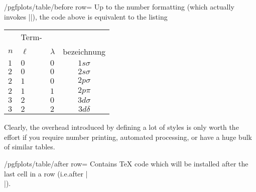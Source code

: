 \documentclass[a4paper]{ltxdoc}
\begin{document}
\begin{key}{/pgfplots/table/before row=}
    Up to the number formatting (which actually invokes |\pgfmathprintnumber|),
    the code above is equivalent to the listing
\begin{codeexample}
\begin{tabular}{|C|C|C|c|}
\hline
{}  & Term-\\
 $n$ & $\ell$ & $\lambda$ & bezeichnung\\
\hline
$1$ & $0$ & $0$ & $1 s\sigma$ \\
$2$ & $0$ & $0$ & $2 s\sigma$ \\
$2$ & $1$ & $0$ & $2 p\sigma$ \\
$2$ & $1$ & $1$ & $2 p \pi$ \\
$3$ & $2$ & $0$ & $3 d\sigma$ \\
$3$ & $2$ & $2$ & $3 d\delta$ \\
\hline
\end{tabular}
\end{codeexample}

    Clearly, the overhead introduced by defining a lot of styles is only worth
    the effort if you require number printing, automated processing, or have a
    huge bulk of similar tables.
\end{key}

\begin{key}{/pgfplots/table/after row=}
    Contains \TeX{} code which will be installed after the last cell in a row
    (i.e.\@ after |\\|).
\end{key}
\end{document}

